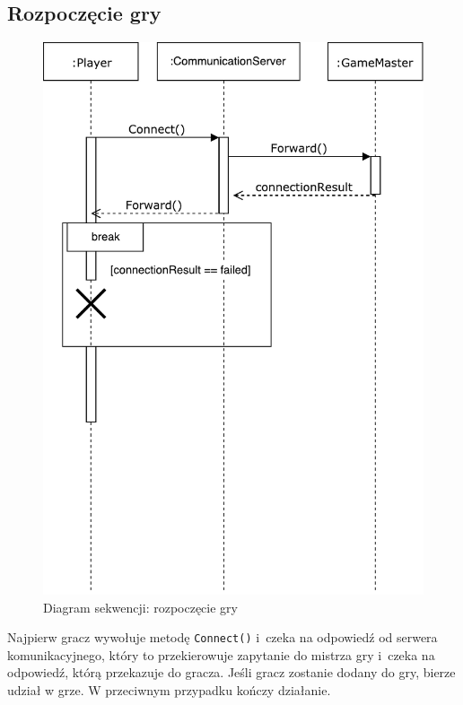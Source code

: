 \documentclass[a4paper]{article}
\newcommand{\code}{\texttt}
\begin{document}
\subsection{Rozpoczęcie gry}
\begin{figure}[H]
\caption{Diagram sekwencji: rozpoczęcie gry}
\centering
\includegraphics[scale=0.8]{sekwencje1.pdf}
\end{figure}

Najpierw gracz wywołuje metodę \code{Connect()} i~czeka na odpowiedź od serwera komunikacyjnego, który to przekierowuje zapytanie do mistrza gry i~czeka na odpowiedź, którą przekazuje do gracza.
Jeśli gracz zostanie dodany do gry, bierze udział w grze.
W przeciwnym przypadku kończy działanie.
\end{document}
